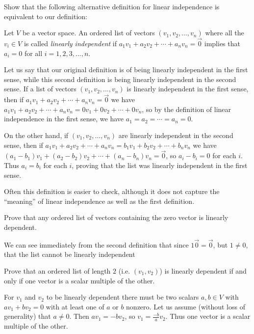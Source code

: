 \documentclass{ximera}
\begin{document}
 
 Show that the following alternative definition for linear independence is equivalent to our definition:
 	
 \begin{definition}
   Let $V$ be a vector space. An ordered list of vectors $(v_1,v_2,\ldots,v_n)$ where all the $v_i \in V$ is called \textit{linearly independent} if
   $a_1v_1+a_2v_2 + \cdots +a_nv_n = \vec{0}$ implies that $a_i = 0 $ for all $i=1,2,3,\ldots,n$.
 \end{definition}
 	
 
 \begin{free-response}
   Let us say that our original definition is of  being linearly independent in the first sense, while this second definition is being linearly independent 
   in the second sense.  If a list of vectors $(v_1,v_2,\ldots,v_n)$ is linearly independent in the first sense, then if $a_1v_1+a_2v_2 + \cdots +a_nv_n = \vec{0}$ we have
   $a_1v_1+a_2v_2 + \cdots +a_nv_n = 0v_1+0v_2+ \cdots +0v_n$, so by the definition of linear independence in the first sense, we have $a_1=a_2= \cdots =a_n=0$.
   
   On the other hand, if $(v_1,v_2,\ldots,v_n)$ are linearly independent in the second sense, then if $a_1v_1+a_2v_2 + \cdots +a_nv_n = b_1v_1 + b_2v_2 + \cdots + b_nv_n$ we have
   $(a_1-b_1)v_1+(a_2-b_2)v_2+\cdots+(a_n-b_n)v_n = \vec{0}$, so $a_i-b_i=0$ for each $i$.  Thus $a_i=b_i$ for each $i$, proving that the list was linearly independent 
   in the first sense.
 \end{free-response}
 
  	Often this definition is easier to check, although it does not capture the ``meaning'' of linear independence as well as the first definition.

 
 	Prove that any ordered list of vectors containing the zero vector is linearly dependent. 
	\begin{free-response}
		We can see immediately from the second definition that since $1\vec{0} = \vec{0}$, but $1\neq 0$, that the list cannot be linearly independent
	\end{free-response}
 
 	Prove that an ordered list of length $2$ (i.e. $(v_1,v_2)$) is linearly dependent if and only if one vector is a scalar multiple of the other.
	\begin{free-response}
		For $v_1$ and $v_2$ to be linearly dependent there must be two scalars $a,b \in V$ with $av_1+bv_2=0$ with at least one of $a$ or $b$ nonzero.
		Let us assume (without loss of generality) that $a \neq 0$.  Then $av_1=-bv_2$, so $v_1=\frac{-b}{a}v_2$.  Thus one vector is a scalar multiple of the other.	
	
		\end{free-response}
\end{document}
